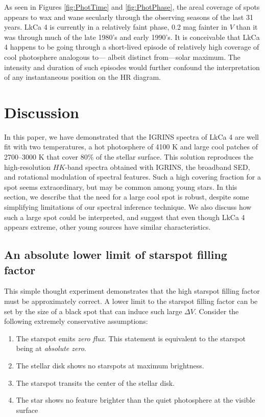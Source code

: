 \documentclass[twocolumn]{emulateapj}%
\begin{document}
As seen in Figures \ref{fig:PhotTime} and \ref{fig:PhotPhase}, the areal coverage of spots appears to wax and wane secularly through the observing seasons of the last 31 years.  LkCa 4 is currently in a relatively faint phase, 0.2 mag fainter in $V$ than it was through much of the late 1980's and early 1990's.  It is conceivable that LkCa 4 happens to be going through a short-lived episode of relatively high coverage of cool photosphere analogous to--- albeit distinct from---solar maximum.  The intensity and duration of such episodes would further confound the interpretation of any instantaneous position on the HR diagram.


\section{Discussion}


In this paper, we have demonstrated that the IGRINS spectra of LkCa 4 are well fit with two temperatures, a hot photosphere of 4100 K and large cool patches of 2700--3000 K that cover 80\% of the stellar surface.  This solution reproduces the high-resolution $HK$-band spectra obtained with IGRINS, the broadband SED, and rotational modulation of spectral features.  Such a high covering fraction for a spot seems extraordinary, but may be common among young stars.  In this section, we describe that the need for a large cool spot is robust, despite some simplifying limitations of our spectral inference technique.  We also discuss how such a large spot could be interpreted, and suggest that even though LkCa 4 appears extreme, other young sources have similar characteristics.


\subsection{An absolute lower limit of starspot filling factor} 

This simple thought experiment demonstrates that the high starspot filling factor must be approximately correct.  A lower limit to the starspot filling factor can be set by the size of a black spot that can induce such large $\Delta V$.  Consider the following extremely conservative assumptions:  \begin{enumerate}
  \item The starspot emits \emph{zero flux}.  This statement is equivalent to the starspot being at \emph{absolute zero}.
  \item The stellar disk shows no starspots at maximum brightness.
  \item The starspot transits the center of the stellar disk.
  \item The star shows no feature brighter than the quiet photosphere at the visible surface
\end{enumerate}
\end{document}
